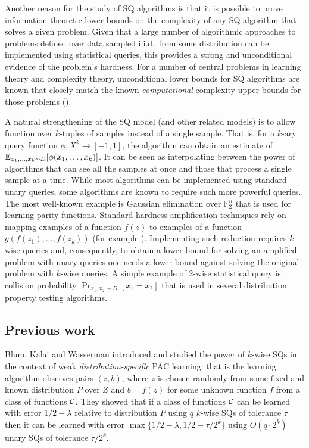 Another reason for the study of SQ algorithms is that it is possible to prove information-theoretic lower bounds on the complexity of any SQ algorithm that solves a given problem. Given that a large number of algorithmic approaches to problems defined over data sampled i.i.d.~from some distribution can be implemented using statistical queries, this provides a strong and unconditional evidence of the problem's hardness. For a number of central problems in learning theory and complexity theory, unconditional lower bounds for SQ algorithms are known that closely match the known {\em computational} complexity upper bounds for those problems (\eg \cite{BlumFJ+:94, FeldmanGRVX:12,FeldmanPV:13,DachmanFTWW:15,DiakonikolasKS:16}). %


A natural strengthening of the SQ model (and other related models) is to allow function over $k$-tuples of samples instead of a single sample. That is, for a $k$-ary query function $\phi:X^k \to [-1,1]$, the algorithm can obtain an estimate of $\Ex_{x_1,\ldots, x_k \sim D}[\phi(x_1,\ldots,x_k)]$. It can be seen as interpolating between the power of algorithms that can see all the samples at once and those that process a single sample at a time. While most algorithms can be implemented using standard unary queries, some algorithms are known to require such more powerful queries. The most well-known example is Gaussian elimination over $\mathbb{F}_2^n$ that is used for learning parity functions. Standard hardness amplification techniques rely on mapping examples of a function $f(z)$ to examples of a function $g(f(z_1),\ldots,f(z_k))$ (for example \cite{BonehLipton:93,FeldmanLS:11colt}). Implementing such reduction requires $k$-wise queries and, consequently, to obtain a lower bound for solving an amplified problem with unary queries one needs a lower bound against solving the original problem with $k$-wise queries. A simple example of 2-wise statistical query is collision probability $\Pr_{x_1,x_2 \sim D} [x_1=x_2]$ that is used in several distribution property testing algorithms.

\subsection{Previous work}
Blum, Kalai and Wasserman \cite{blum2003noise} introduced and studied the power of $k$-wise SQs in the context of weak {\em distribution-specific} PAC learning: that is the learning algorithm observes pairs $(z,b)$, where $z$ is chosen randomly from some fixed and known distribution $P$ over $Z$ and $b=f(z)$ for some unknown function $f$ from a class of functions $\cal C$. They showed that if a class of functions $\cal C$ can be learned with error $1/2-\lambda$ relative to distribution $P$ using $q$ $k$-wise SQs of tolerance $\tau$ then it can be learned with error $\max\{1/2 - \lambda, 1/2 -\tau/2^k \}$ using $O(q \cdot 2^k)$ unary SQs of tolerance $\tau/2^k$.

